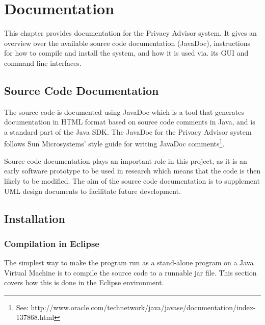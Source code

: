  

\chapter{Documentation}\label{doc}

\minitoc

This chapter provides documentation for the Privacy Advisor system. It gives an overview over the available source code documentation (JavaDoc), instructions for how to compile and install the system, and how it is used via. its GUI and command line interfaces.

\section{Source Code Documentation} 

The source code is documented using JavaDoc which is a tool that generates documentation in HTML format based on source code comments in Java, and is a standard part of the Java SDK. The JavaDoc for the Privacy Advisor system follows Sun Microsystems' style guide for writing JavaDoc comments\footnote{See: http://www.oracle.com/technetwork/java/javase/documentation/index-137868.html}. 

Source code documentation plays an important role in this project, as it is an early software prototype to be used in research which means that the code is then likely to be modified. The aim of the source code documentation is to supplement UML design documents to facilitate future development.



\section{Installation}


\subsection{Compilation in Eclipse} \label{LocalInst}
The simplest way to make the program run as a stand-alone program on a Java Virtual Machine is to compile the source code to a runnable jar file. This section covers how this is done in the Eclipse environment.

